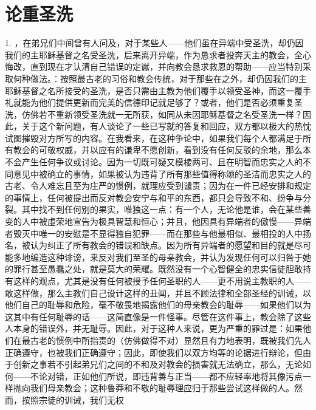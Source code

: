 
\chapter{论重圣洗}


\par

1. ，在弟兄们中间曾有人问及，对于某些人——他们虽在异端中受圣洗，却仍因我们的主耶稣基督之名受圣洗，后来离开异端，作为恳求者投奔天主的教会，全心悔改，直到现在才认清自己错误的定谳，并向教会恳求救恩的帮助——应当特别采取何种做法。：按照最古老的习俗和教会传统，对于那些在之外，却仍因我们的主耶稣基督之名所接受的圣洗，是否只需由主教为他们覆手以领受圣神，而这一覆手礼就能为他们提供更新而完美的信德印记就足够了？或者，他们是否必须重复圣洗，仿佛若不重新领受圣洗就一无所获，如同从未因耶稣基督之名受圣洗一样？因此，关于这个新问题，有人谈论了一些已写就的答复和回应，双方都以极大的热忱试图摧毁对方所写的内容。在我看来，在这种争论中，如果我们每个人都满足于所有教会的可敬权威，并以应有的谦卑不愿创新，看到没有任何反驳的余地，那么本不会产生任何争议或讨论。因为一切既可疑又模棱两可、且在明智而忠实之人的不同意见中被确立的事情，如果被认为违背了所有那些值得称颂的圣洁而忠实之人的古老、令人难忘且至为庄严的惯例，就理应受到谴责；因为在一件已经安排和规定的事情上，任何被提出而反对教会安宁与和平的东西，都只会导致不和、纷争与分裂。其中找不到任何别的果实，唯独这一点：有一个人，无论他是谁，会在某些善变的人中被虛荣地宣告为极具智慧和恒心；并且，他因具有异端者的傲慢——异端者毁灭中唯一的安慰是不显得独自犯罪——而在那些与他最相似、最相投的人中扬名，被认为纠正了所有教会的错误和缺点。因为所有异端者的愿望和目的就是尽可能多地编造这种诽谤，来反对我们至圣的母亲教会，并认为发现任何可以归咎于她的罪行甚至愚蠢之处，就是莫大的荣耀。既然没有一个心智健全的忠实信徒胆敢持有这样的观点，尤其是没有任何被授予任何圣职的人——更不用说主教职的人——敢这样做，那么主教们自己设计这样的丑闻，并且不顾法律和全部圣经的训诫，以他们自己的耻辱和危险，毫不敬畏地揭露他们的母亲教会的耻辱——如果他们以为这其中有任何耻辱的话——这简直像是一件怪事。尽管在这件事上，教会除了这些人本身的错误外，并无耻辱。因此，对于这种人来说，更为严重的罪过是：如果他们在最古老的惯例中所指责的（仿佛做得不对）显然且有力地表明，既被我们先人正确遵守，也被我们正确遵守；因此，即使我们以双方均等的论据进行辩论，但由于创新之事若不引起弟兄们之间的不和及对教会的损害就无法确立，那么，无论如何——不论对错，正如他们所说，即违背善与正当——都不应轻率地将其像污点一样抛向我们母亲教会；这种鲁莽和不敬的耻辱理应归于那些尝试这样做的人。然而，按照宗徒的训诫，我们无权  